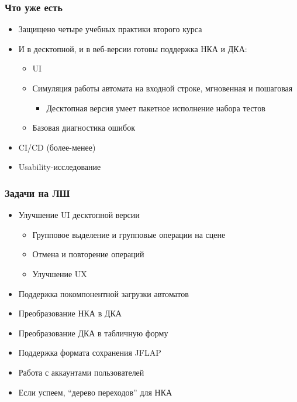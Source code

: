 \documentclass[xetex,mathserif,serif]{beamer}
\begin{document}
    \begin{frame}
        \frametitle{Что уже есть}
        \begin{itemize}
            \item Защищено четыре учебных практики второго курса
            \item И в десктопной, и в веб-версии готовы поддержка НКА и ДКА:
            \begin{itemize}
                \item UI
                \item Симуляция работы автомата на входной строке, мгновенная и пошаговая
                \begin{itemize}
                    \item Десктопная версия умеет пакетное исполнение набора тестов
                \end{itemize}
                \item Базовая диагностика ошибок
            \end{itemize}
            \item CI/CD (более-менее)
            \item Usability-исследование
        \end{itemize}
    \end{frame}

    \begin{frame}
        \frametitle{Задачи на ЛШ}
        \begin{itemize}
            \item Улучшение UI десктопной версии
            \begin{itemize}
                \item Групповое выделение и групповые операции на сцене
                \item Отмена и повторение операций
                \item Улучшение UX
            \end{itemize}
            \item Поддержка покомпонентной загрузки автоматов
            \item Преобразование НКА в ДКА
            \item Преобразование ДКА в табличную форму
            \item Поддержка формата сохранения JFLAP
            \item Работа с аккаунтами пользователей
            \item Если успеем, ``дерево переходов'' для НКА
        \end{itemize}
    \end{frame}
\end{document}
